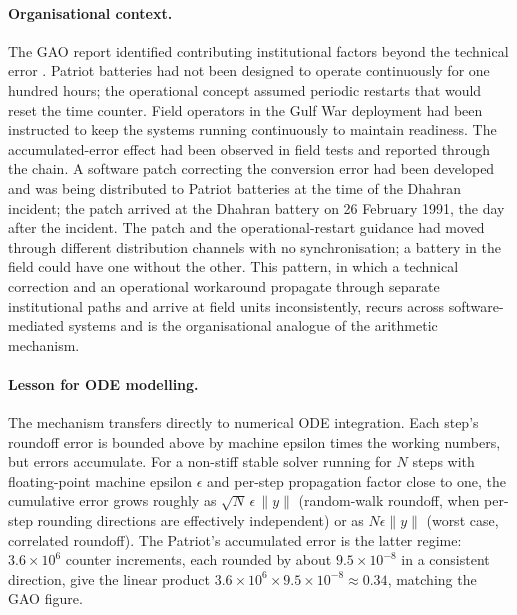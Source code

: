 \paragraph{Organisational context.} The GAO report identified
contributing institutional factors beyond the technical error
\cite{acc:gao-patriot-1992}. Patriot batteries had not been
designed to operate continuously for one hundred hours; the
operational concept assumed periodic restarts that would reset the
time counter. Field operators in the Gulf War deployment had been
instructed to keep the systems running continuously to maintain
readiness. The accumulated-error effect had been observed in field
tests and reported through the chain. A software patch correcting
the conversion error had been developed and was being distributed
to Patriot batteries at the time of the Dhahran incident; the patch
arrived at the Dhahran battery on 26 February 1991, the day after
the incident. The patch and the operational-restart guidance had
moved through different distribution channels with no
synchronisation; a battery in the field could have one without the
other. This pattern, in which a technical correction and an
operational workaround propagate through separate institutional
paths and arrive at field units inconsistently, recurs across
software-mediated systems and is the organisational analogue of the
arithmetic mechanism.

\paragraph{Lesson for ODE modelling.} The mechanism transfers
directly to numerical ODE integration. Each step's roundoff error
is bounded above by machine epsilon times the working numbers, but
errors accumulate. For a non-stiff stable solver running for $N$
steps with floating-point machine epsilon $\epsilon$ and per-step
propagation factor close to one, the cumulative error grows roughly
as $\sqrt{N}\, \epsilon\, \|y\|$ (random-walk roundoff, when
per-step rounding directions are effectively independent) or as
$N \epsilon \|y\|$ (worst case, correlated roundoff). The Patriot's
accumulated error is the latter regime: $3.6 \times 10^{6}$ counter
increments, each rounded by about $9.5 \times 10^{-8}$ in a
consistent direction, give the linear product $3.6 \times 10^{6}
\times 9.5 \times 10^{-8} \approx 0.34$, matching the GAO figure.

